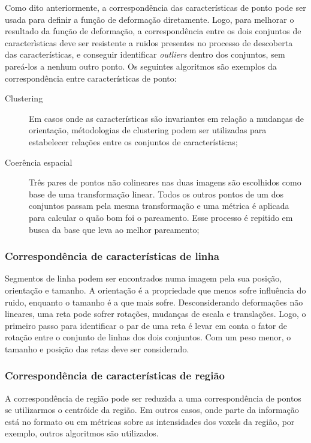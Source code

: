   Como dito anteriormente, a correspondência das características de ponto pode
ser usada para definir a função de deformação diretamente. Logo, para melhorar
o resultado da função de deformação, a correspondência entre os dois conjuntos
de caracterìsticas deve ser resistente a ruidos presentes no processo de
descoberta das características, e conseguir identificar \textit{outliers} dentro
dos conjuntos, sem pareá-los a nenhum outro ponto. Os seguintes algoritmos
são exemplos da correspondência entre características de ponto:

\begin{description}
    \item [Clustering] Em casos onde as características são invariantes em relação
          a mudanças de orientação, métodologias de clustering podem ser utilizadas
          para estabelecer relações entre os conjuntos de características;
    \item [Coerência espacial] Três pares de pontos não colineares nas duas imagens
          são escolhidos como base de uma transformação linear. Todos os outros
          pontos de um dos conjuntos passam pela mesma transformação e uma métrica
          é aplicada para calcular o quão bom foi o pareamento. Esse processo é repitido
          em busca da base que leva ao melhor pareamento;
\end{description}

\subsubsection{Correspondência de características de linha}

  Segmentos de linha podem ser encontrados numa imagem pela sua posição, orientação
e tamanho. A orientação é a propriedade que menos sofre influência do ruido, enquanto
o tamanho é a que mais sofre. Desconsiderando deformações não lineares, uma reta
pode sofrer rotações, mudanças de escala e translações. Logo, o primeiro passo
para identificar o par de uma reta é levar em conta o fator de rotação entre o conjunto
de linhas dos dois conjuntos. Com um peso menor, o tamanho e posição das retas
deve ser considerado.

\subsubsection{Correspondência de características de região}

  A correspondência de região pode ser reduzida a uma correspondência de pontos
se utilizarmos o centróide da região. Em outros casos, onde parte da informação
está no formato ou em métricas sobre as intensidades dos voxels da região,
por exemplo, outros algoritmos são utilizados.

